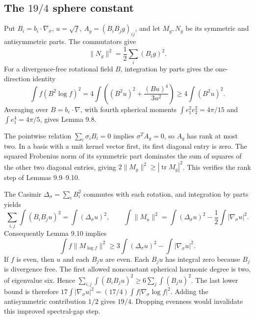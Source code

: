 \documentclass[10pt]{article}
\begin{document}
\subsection*{The \(19/4\) sphere constant}
Put \(B_i=b_i\cdot\nabla_\sigma\), \(u=\sqrt f\), \(A_g=(B_iB_jg)_{ij}\), and let \(M_g,N_g\) be its symmetric and antisymmetric parts. The commutators give \[\|N_g\|^2=\frac12\sum_i(B_i g)^2.\] For a divergence-free rotational field \(B\), integration by parts gives the one-direction identity \[\int f(B^2\log f)^2
 =4\int\left((B^2u)^2+\frac{(Bu)^4}{3u^2}\right)
 \geq4\int(B^2u)^2.\] Averaging over \(B=b_e\cdot\nabla\), with fourth spherical moments \(\int e_1^2e_2^2=4\pi/15\) and \(\int e_1^4=4\pi/5\), gives Lemma 9.8.\par
The pointwise relation \(\sum_i\sigma_i B_i=0\) implies \(\sigma^T A_g=0\), so \(A_g\) has rank at most two. In a basis with a unit kernel vector first, its first diagonal entry is zero. The squared Frobenius norm of its symmetric part dominates the sum of squares of the other two diagonal entries, giving \(2\|M_g\|^2\geq|\operatorname{tr}M_g|^2\). This verifies the rank step of Lemmas 9.9–9.10.\par
The Casimir \(\Delta_\sigma=\sum_i B_i^2\) commutes with each rotation, and integration by parts yields \[\sum_{i,j}\int(B_iB_j u)^2=\int(\Delta_\sigma u)^2,\qquad
 \int\|M_u\|^2=\int(\Delta_\sigma u)^2-\frac12\int|\nabla_\sigma u|^2.\] Consequently Lemma 9.10 implies \[\int f\|M_{\log f}\|^2
 \geq 3\int(\Delta_\sigma u)^2-\int|\nabla_\sigma u|^2.\] If \(f\) is even, then \(u\) and each \(B_j u\) are even. Each \(B_j u\) has integral zero because \(B_j\) is divergence free. The first allowed nonconstant spherical harmonic degree is two, of eigenvalue six. Hence \(\sum_{i,j}\int(B_iB_j u)^2\geq6\sum_j\int(B_j u)^2\). The last lower bound is therefore \(17\int|\nabla_\sigma u|^2
=(17/4)\int f|\nabla_\sigma\log f|^2\). Adding the antisymmetric contribution \(1/2\) gives \(19/4\). Dropping evenness would invalidate this improved spectral-gap step.\par
\end{document}
